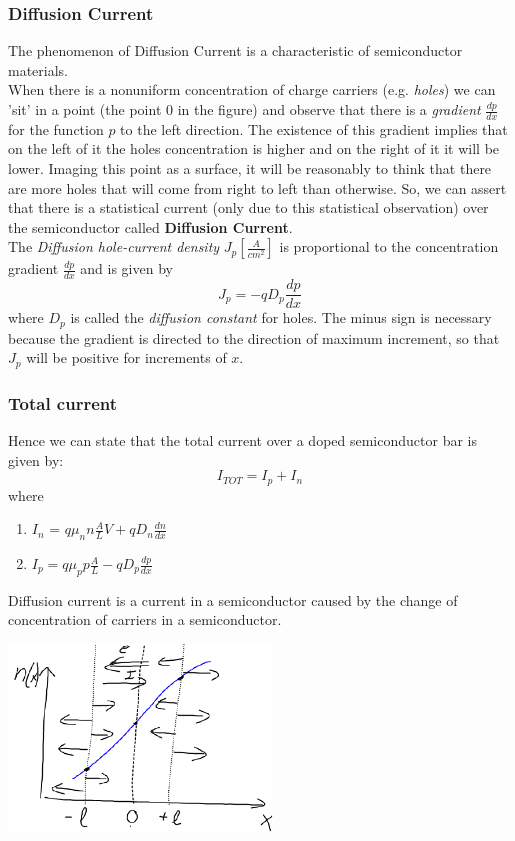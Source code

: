 \documentclass[12pt]{article}
\newcommand{\B}{\textbf}
\newcommand{\I}{\textit}
\begin{document}
\subsubsection{Diffusion Current} 
The phenomenon of Diffusion Current is a characteristic of semiconductor materials. \\
When there is a nonuniform concentration of charge carriers (e.g. \I{holes}) we can 'sit' in a point (the point 0 in the figure) and observe that there is a \I{gradient} $\frac{dp}{dx}$ for the function $p$ to the left direction. The existence of this gradient implies that on the left of it the holes concentration is higher and on the right of it it will be lower. Imaging this point as a surface, it will be reasonably to think that there are more holes that will come from right to left than otherwise. So, we can assert that there is a statistical current (only due to this statistical observation) over the semiconductor called \B{Diffusion Current}. \\
The \I{Diffusion hole-current density} $J_p [\frac{A}{cm^2}]$ is proportional to the concentration gradient $\frac{dp}{dx}$ and is given by
\begin{equation}
J_p = -qD_p\frac{dp}{dx}
\end{equation}
where $D_p$ is called the \I{diffusion constant} for holes. The minus sign is necessary because the gradient is directed to the direction of maximum increment, so that $J_p$ will be positive for increments of $x$. 
\subsubsection{Total current}
Hence we can state that the total current over a doped semiconductor bar is given by:
\begin{equation}
I_{TOT} = I_p + I_n	
\end{equation}
where 
\begin{enumerate}
	\item $I_n$ = $q \mu_nn \frac{A}{L} V + q D_n \frac{dn}{dx}$
	\item $I_p = q \mu_pp \frac{A}{L} - q D_p \frac{dp}{dx}$
\end{enumerate}


Diffusion current is a current in a semiconductor caused by the change of concentration of carriers in a semiconductor. \\
\begin{center}
	\includegraphics[width=7cm]{diffusion}
\end{center}
\end{document}
